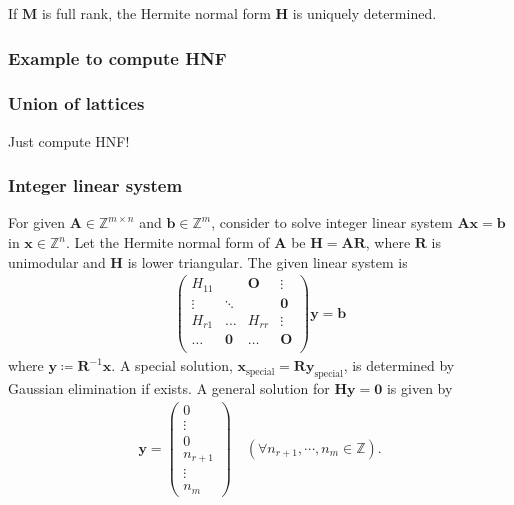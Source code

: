 If $\mathbf{M}$ is full rank, the Hermite normal form $\bm{H}$ is uniquely determined.

\subsubsection{Example to compute HNF}

\subsubsection{Union of lattices}

Just compute HNF!

\subsubsection{\label{sec:integer-linear-system}Integer linear system}

For given $\bm{A} \in \mathbb{Z}^{m \times n}$ and $\bm{b} \in \mathbb{Z}^{m}$, consider to solve integer linear system $\bm{Ax} = \bm{b}$ in $\bm{x} \in \mathbb{Z}^{n}$.
Let the Hermite normal form of $\bm{A}$ be $\bm{H} = \bm{AR}$, where $\bm{R}$ is unimodular and $\bm{H}$ is lower triangular.
The given linear system is
\begin{align}
  \begin{pmatrix}
    H_{11} &        & \bm{O} & \vdots     \\
    \vdots & \ddots &        & \bm{0} \\
    H_{r1} & \ldots & H_{rr} & \vdots     \\
    \ldots & \bm{0} & \ldots & \bm{O} \\
  \end{pmatrix}
  \bm{y} = \bm{b}
\end{align}
where $\mathbf{y} \coloneqq \bm{R}^{-1}\bm{x}$.
A special solution, $\bm{x}_{\mathrm{special}} = \bm{R}\bm{y}_{\mathrm{special}}$, is determined by Gaussian elimination if exists.
A general solution for $\bm{Hy}=\bm{0}$ is given by
\begin{align}
  \bm{y} = \begin{pmatrix} 0 \\ \vdots \\ 0 \\ n_{r+1} \\ \vdots \\ n_{m} \end{pmatrix}
        \quad (\forall n_{r+1},\cdots, n_{m} \in \mathbb{Z}).
\end{align}


